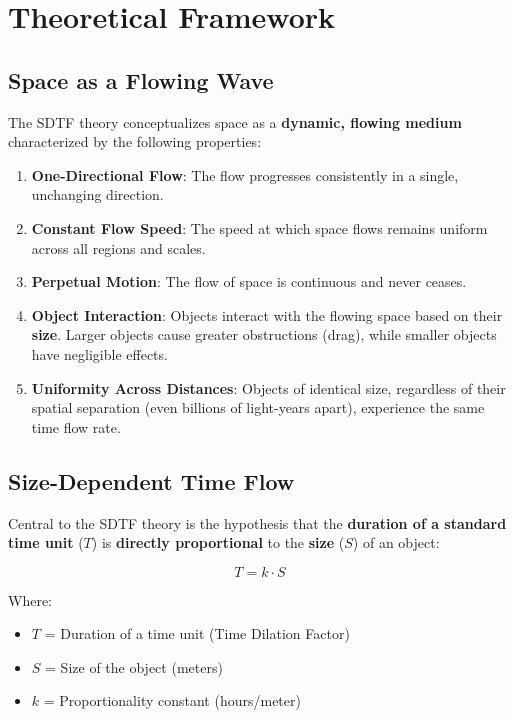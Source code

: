 \documentclass[12pt]{article}
\begin{document}
\section{Theoretical Framework}

\subsection{Space as a Flowing Wave}

The SDTF theory conceptualizes space as a \textbf{dynamic, flowing medium} characterized by the following properties:

\begin{enumerate}
    \item \textbf{One-Directional Flow}: The flow progresses consistently in a single, unchanging direction.
    \item \textbf{Constant Flow Speed}: The speed at which space flows remains uniform across all regions and scales.
    \item \textbf{Perpetual Motion}: The flow of space is continuous and never ceases.
    \item \textbf{Object Interaction}: Objects interact with the flowing space based on their \textbf{size}. Larger objects cause greater obstructions (drag), while smaller objects have negligible effects.
    \item \textbf{Uniformity Across Distances}: Objects of identical size, regardless of their spatial separation (even billions of light-years apart), experience the same time flow rate.
\end{enumerate}

\subsection{Size-Dependent Time Flow}

Central to the SDTF theory is the hypothesis that the \textbf{duration of a standard time unit} (\( T \)) is \textbf{directly proportional} to the \textbf{size} (\( S \)) of an object:

\begin{equation}
    T = k \cdot S
    \label{eq:time_flow}
\end{equation}

Where:
\begin{itemize}
    \item \( T \) = Duration of a time unit (Time Dilation Factor)
    \item \( S \) = Size of the object (meters)
    \item \( k \) = Proportionality constant (hours/meter)
\end{itemize}
\end{document}
